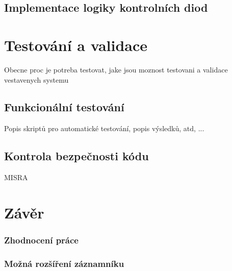\section{Implementace logiky kontrolních diod}

\chapter{Testování a validace}
Obecne proc je potreba testovat, jake jsou moznost testovani a validace vestavenych systemu

\section{Funkcionální testování}
Popis skriptů pro automatické testování, popis výsledků, atd, ...

\section{Kontrola bezpečnosti kódu}
MISRA

\chapter{Závěr}
\label{zaverPrace}

\subsection{Zhodnocení práce}
\label{zhodnocení_prace}

\subsection{Možná rozšíření záznamníku}
\label{zhodnocení_prace}



%
